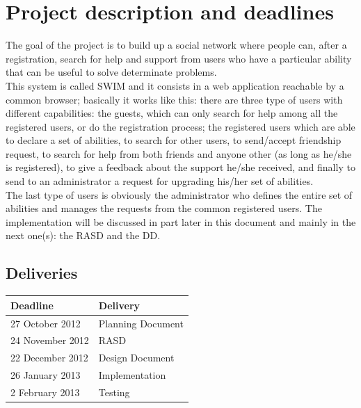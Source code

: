 \documentclass[a4paper,12pt]{article}
\begin{document}
	    \vspace*{\fill}
	\tableofcontents
	    \vspace*{\fill}

\clearpage

\section{Project description and deadlines}
The goal of the project is to build up a social network where people can, after a registration, search for help and support from users who have a particular ability that can be useful to solve determinate problems.\\[1\baselineskip]This system is called SWIM and it consists in a web application reachable by a common browser; basically it works like this: there are three type of users with different capabilities: the guests, which can only search for help among all the registered users, or do the registration process; the registered users which are able to declare a set of abilities, to search for other users, to send/accept friendship request, to search for help from both friends and anyone other (as long as he/she is registered), to give a feedback about the support he/she received, and finally to send to an administrator a request for upgrading his/her set of abilities.\\[1\baselineskip]The last type of users is obviously the administrator who defines the entire set of abilities and manages the requests from the common registered users. The implementation will be discussed in part later in this document and mainly in the next one(s): the RASD and the DD.

\subsection{Deliveries}
\begin{center}
\begin{tabular}{l|l}
\hline \textbf{Deadline} & \textbf{Delivery} \\
\hline 27 October 2012 & Planning Document \\
\hline 24 November 2012 & RASD \\ 
\hline 22 December 2012 & Design Document \\
\hline 26 January 2013 & Implementation \\
\hline 2 February 2013 & Testing \\
\hline 
\end{tabular}
\end{center}
\end{document}

